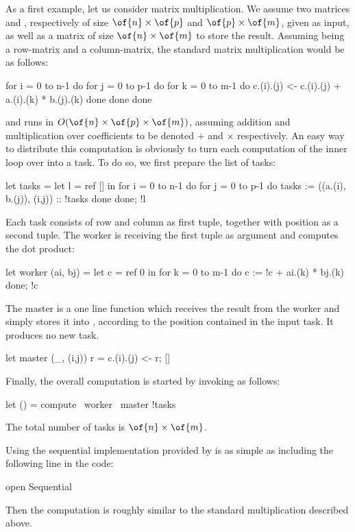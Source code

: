 \documentclass[a4paper,12pt]{article}
\begin{document}
As a first example, let us consider matrix multiplication.
We assume two matrices  and , respectively of size
$\of{n}\times\of{p}$ and $\of{p}\times\of{m}$, given as input, as well as
a matrix  of size $\of{n}\times\of{m}$ to store the result.
Assuming  being a row-matrix and  a column-matrix,
the standard matrix multiplication would be as follows:
\begin{ocaml}
  for i = 0 to n-1 do
    for j = 0 to p-1 do
      for k = 0 to m-1 do
	c.(i).(j) <- c.(i).(j) + a.(i).(k) * b.(j).(k)
      done
    done
  done  
\end{ocaml}
and runs in $O(\of{n}\times\of{p}\times\of{m})$, 
assuming addition and multiplication over coefficients to be 
denoted $+$ and $\times$ respectively.
An easy way to distribute this computation is obviously to turn each
computation of the inner loop over  into a task.
To do so, we first prepare the list of tasks:
\begin{ocaml}
  let tasks = 
    let l = ref [] in
    for i = 0 to n-1 do for j = 0 to p-1 do
      tasks := ((a.(i), b.(j)), (i,j)) :: !tasks
    done done;
    !l
\end{ocaml}
Each task consists of row  and column  as first
tuple, together with position  as a second tuple.
The worker is receiving the first tuple as argument and computes
the dot product:
\begin{ocaml}
  let worker (ai, bj) =
    let c = ref 0 in
    for k = 0 to m-1 do c := !c + ai.(k) * bj.(k) done;
    !c
\end{ocaml}
The master is a one line function which receives the result 
from the worker and simply stores it into , according to the
position contained in the input task. It produces no new task.
\begin{ocaml}
  let master (_, (i,j)) r = c.(i).(j) <- r; []
\end{ocaml}
Finally, the overall computation is started by invoking 
as follows:
\begin{ocaml}
  let () = compute ~worker ~master !tasks
\end{ocaml}
The total number of tasks is $\of{n}\times\of{m}$.

Using the sequential implementation provided by  is as
simple as including the following line in the code:
\begin{ocaml}
  open Sequential
\end{ocaml}
Then the computation is roughly similar to the standard multiplication
described above. 
\end{document}

